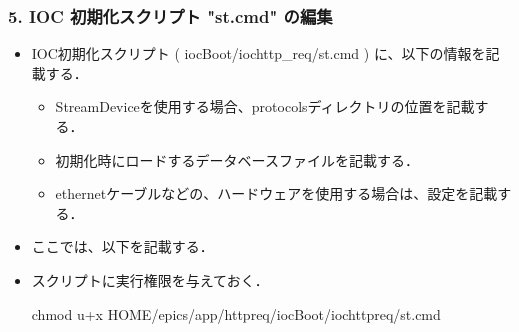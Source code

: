 \documentclass[letterpaper,10pt,dvipdfmx]{sphinxmanual}
\begin{document}
\subsubsection{5. IOC 初期化スクリプト "st.cmd" の編集}
\label{\detokenize{epics/rst/example1__httpRequest_to_Google:ioc-st-cmd}}\begin{itemize}
\item {} 
IOC初期化スクリプト ( iocBoot/iochttp\_req/st.cmd ) に、以下の情報を記載する．
\begin{itemize}
\item {} 
StreamDeviceを使用する場合、protocolsディレクトリの位置を記載する．

\item {} 
初期化時にロードするデータベースファイルを記載する．

\item {} 
ethernetケーブルなどの、ハードウェアを使用する場合は、設定を記載する．

\end{itemize}

\item {} 
ここでは、以下を記載する．

\begin{sphinxVerbatim}[commandchars=\\\{\}]
   
   
  
\end{sphinxVerbatim}

\item {} 
スクリプトに実行権限を与えておく．

\begin{sphinxVerbatim}[commandchars=\\\{\}]
\PYGZdl{} chmod u+x \PYGZdl{}HOME/epics/app/http\PYGZus{}req/iocBoot/iochttp\PYGZus{}req/st.cmd
\end{sphinxVerbatim}

\end{itemize}
\end{document}
